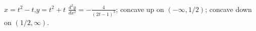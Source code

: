 {$x=t^2-t$,\quad  $y=t^2+t$}
{$\frac{d^2y}{dx^2}=-\frac{4}{(2t-1)^3}$; concave up on $(-\infty,1/2)$; concave down on $(1/2,\infty)$.}
